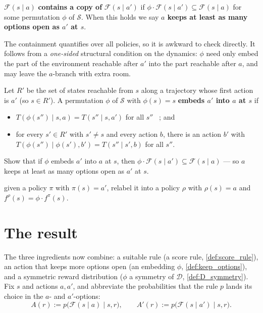 \documentclass[11pt]{article}
\newcommand{\cS}{\mathcal{S}}
\newcommand{\Dist}{\mathcal{D}}    %
\newcommand{\F}{\mathcal{F}}       %
\begin{document}
\begin{definition}\label{def:keep_options}
$\F(s\mid a)$ \textbf{contains a copy of} $\F(s\mid a')$ if $\phi \cdot \F(s\mid a') \subseteq \F(s\mid a)$
for some permutation $\phi$ of $\cS$. When this holds we say \textbf{$a$ keeps at least as many
options open as $a'$ at $s$}.
\end{definition}


The containment quantifies over all policies, so it is awkward to check directly. It follows from a
\emph{one-sided} structural condition on the dynamics: $\phi$ need only embed the part of the
environment reachable after $a'$ into the part reachable after $a$, and may leave the $a$-branch
with extra room.

\begin{definition}\label{def:dyn_embedding}
Let $R'$ be the set of states reachable from $s$ along a trajectory whose first action is $a'$
(so $s \in R'$). A permutation $\phi$ of $\cS$ with $\phi(s) = s$ \textbf{embeds $a'$ into $a$
at $s$} if
\begin{itemize}\itemsep=2pt
  \item[(i)] $T(\phi(s'') \mid s, a) = T(s'' \mid s, a')$ for all $s''$ \ ; and
  \item[(ii)] for every $s' \in R'$ with $s' \ne s$ and every action $b$, there is an action
  $b'$ with $T(\phi(s'') \mid \phi(s'), b') = T(s'' \mid s', b)$ for all $s''$.
\end{itemize}
\end{definition}

\begin{exercise}
\label{prob:embedding_gives_copy} Show that if $\phi$ embeds $a'$ into $a$ at
$s$, then $\phi \cdot \F(s\mid a') \subseteq \F(s\mid a)$ --- so $a$ keeps at least as many
options open as $a'$ at $s$.
\end{exercise}
\begin{hint}
given a policy $\pi$ with $\pi(s)=a'$, relabel it into a policy $\rho$ with
$\rho(s)=a$ and $f^\rho(s) = \phi \cdot f^\pi(s)$.
\end{hint}


\section*{The result}

The three ingredients now combine: a suitable rule (a score rule, \cref{def:score_rule}), an action
that keeps more options open (an embedding $\phi$, \cref{def:keep_options}), and a symmetric reward
distribution ($\phi$ a symmetry of $\Dist$, \cref{def:D_symmetry}). Fix $s$ and actions $a,a'$, and
abbreviate the probabilities that the rule $p$ lands its choice in the $a$- and $a'$-options:
$$
A(r) := p\bigl(\F(s\mid a)\mid s,r\bigr), \qquad A'(r) := p\bigl(\F(s\mid a')\mid s,r\bigr).
$$
\end{document}
